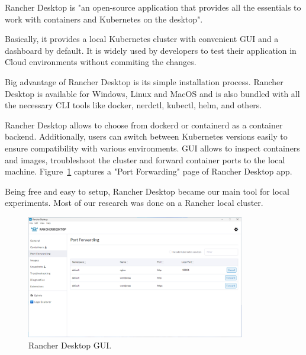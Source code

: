 Rancher Desktop is "an open-source application that provides all the essentials to work with containers and Kubernetes on the desktop". \cite{rancher-desktop}

Basically, it provides a local Kubernetes cluster with convenient GUI and a dashboard by default. It is widely used by developers to test their application in Cloud environments without commiting the changes. 

Big advantage of Rancher Desktop is its simple installation process. Rancher Desktop is available for Windows, Linux and MacOS and is also bundled with all the necessary CLI tools like docker, nerdctl, kubectl, helm, and others.

Rancher Desktop allows to choose from dockerd or containerd as a container backend. Additionally, users can switch between Kubernetes versions easily to ensure compatibility with various environments. GUI allows to inspect containers and images, troubleshoot the cluster and forward container ports to the local machine. Figure~\ref{img:rancher-desktop} captures a "Port Forwarding" page of Rancher Desktop app.

Being free and easy to setup, Rancher Desktop became our main tool for local experiments. Most of our research was done on a Rancher local cluster. 

\begin{figure}[!hbt]
	\begin{center}
		\includegraphics[width=0.85\textwidth]{images/rancher-desktop.png}
        \caption{Rancher Desktop GUI.}
		\label{img:rancher-desktop}
	\end{center}
\end{figure}